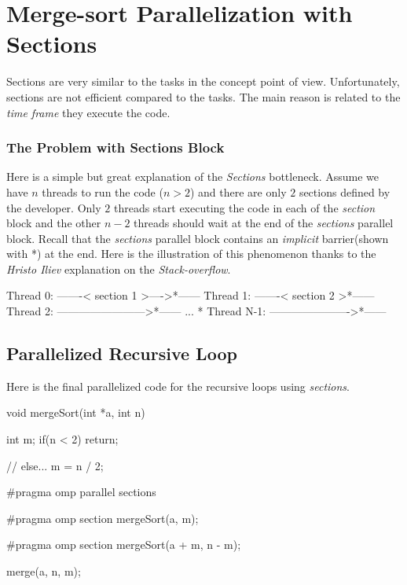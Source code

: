 \documentclass[12pt]{article}
\numberwithin{equation}{section}
\numberwithin{table}{section}
\numberwithin{figure}{section}
\begin{document}
\section{Merge-sort Parallelization with Sections}
Sections are very similar to the tasks in the concept point of view. Unfortunately, sections are not efficient compared to the tasks. The main reason is related to the \textit{time frame} they execute the code.
\subsubsection{The Problem with Sections Block}
Here is a simple but great explanation of the \textit{Sections} bottleneck. Assume we have $n$ threads to run the code ($n > 2$) and there are only $2$ sections defined by the developer. Only $2$ threads start executing the code in each of the \textit{section} block and the other $n-2$ threads should wait at the end of the \textit{sections} parallel block. Recall that the \textit{sections} parallel block contains an \textit{implicit} barrier(shown with *) at the end. Here is the illustration of this phenomenon thanks to the \textit{Hristo Iliev} explanation on the \textit{Stack-overflow}.
\begin{cpp}
						                 [    sections     ]
						Thread 0: -------< section 1 >---->*------
						Thread 1: -------< section 2      >*------
						Thread 2: ------------------------>*------
						...                                *
						Thread N-1: ---------------------->*------
\end{cpp}

\subsection{Parallelized Recursive Loop}
Here is the final parallelized code for the recursive loops using \textit{sections}.
\begin{cpp}
		void mergeSort(int *a, int n) {
			
			int m;
			if(n < 2)
			return;
			
			// else...
			m = n / 2;
			
			#pragma omp parallel sections
			{
				
				#pragma omp section
				mergeSort(a, m);
				
				#pragma omp section
				mergeSort(a + m, n - m);
			}
			merge(a, n, m);
		}
\end{cpp}
\end{document}
